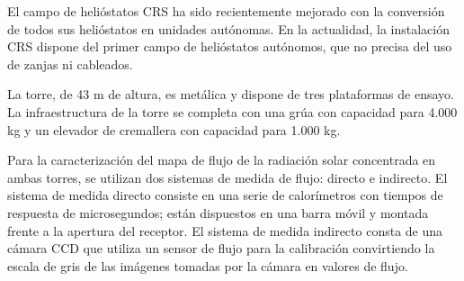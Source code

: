 El campo de helióstatos CRS ha sido recientemente mejorado con la conversión de todos sus helióstatos en unidades autónomas. En la actualidad, la instalación CRS dispone del primer campo de helióstatos autónomos, que no precisa del uso de zanjas ni cableados.

La torre, de 43 m de altura, es metálica y dispone de tres plataformas de ensayo.
La infraestructura de la torre se completa con una grúa con capacidad para 4.000 kg y un elevador de cremallera con capacidad para 1.000 kg.

Para la caracterización del mapa de flujo de la radiación solar concentrada en ambas torres, se utilizan dos sistemas de medida de flujo: directo e indirecto. El sistema de medida directo consiste en una serie de calorímetros con tiempos de respuesta de microsegundos; están dispuestos en una barra móvil y montada frente a la apertura del receptor. El sistema de medida indirecto consta de una cámara CCD que utiliza un sensor de flujo para la calibración convirtiendo la escala de gris de las imágenes tomadas por la cámara en valores de flujo. \cite{PSA4WebSite}
